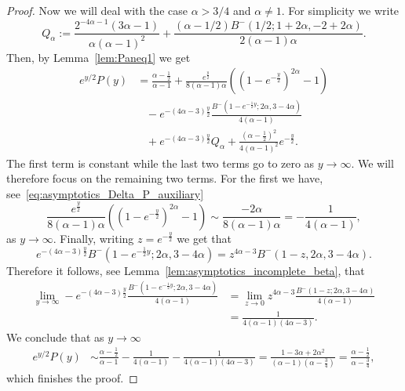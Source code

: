 \begin{proof}
Now we will deal with the case $\alpha > 3/4$ and $\alpha \not = 1$. For simplicity we write
\[
	Q_\alpha := \frac{2^{-4 \alpha-1} (3 \alpha - 1)}{\alpha (\alpha - 1)^2} 
		+ \frac{(\alpha - 1/2 ) B^-(1/2; 1 + 2 \alpha, -2 + 2 \alpha)}{2(\alpha - 1) \alpha}.
\]
Then, by Lemma~\ref{lem:Paneq1} we get
\begin{align*}
	e^{y/2} P(y) &= \frac{\alpha - \frac{1}{2}}{\alpha - 1} 
		+ \frac{e^{\frac{y}{2}}}{8(\alpha - 1)\alpha}\left(\left(1 - e^{-\frac{y}{2}}\right)^{2\alpha}-1\right)\\
	&\hspace{10pt}- e^{-(4\alpha - 3)\frac{y}{2}}\frac{B^-(1 - e^{-\frac{1}{2}y}; 2 \alpha, 3 - 4 \alpha)}{4 (\alpha - 1)}\\
	&\hspace{10pt}+ e^{-(4\alpha - 3)\frac{y}{2}}Q_\alpha + \frac{(\alpha-\frac{1}{2})^2}{4(\alpha-1)^2} e^{-\frac{y}{2}}.
\end{align*}
The first term is constant while the last two terms go to zero as $y \to \infty$. We will therefore focus on the remaining two terms. For the first we have, see~\eqref{eq:asymptotics_Delta_P_auxiliary} 
\[
	\frac{e^{\frac{y}{2}}}{8(\alpha - 1)\alpha}\left(\left(1 - e^{-\frac{y}{2}}\right)^{2\alpha}-1\right) 
	\sim \frac{-2\alpha}{8(\alpha - 1)\alpha} = -\frac{1}{4(\alpha -1)},
\]
as $y \to \infty$. Finally, writing $z = e^{-\frac{y}{2}}$ we get that
\[
	e^{-(4\alpha - 3)\frac{y}{2}} B^-(1 - e^{-\frac{1}{2}y}; 2 \alpha, 3 - 4 \alpha)
	= z^{4\alpha - 3} B^-(1 - z, 2 \alpha, 3 - 4 \alpha).
\]
Therefore it follows, see Lemma~\ref{lem:asymptotics_incomplete_beta}, that
\begin{align*}
	\lim_{y \to \infty} - e^{-(4\alpha - 3)\frac{y}{2}}
		\frac{B^-(1 - e^{-\frac{1}{2}y}; 2 \alpha, 3 - 4 \alpha)}{4 (\alpha - 1)}
	&= \lim_{z \to 0} z^{4\alpha - 3} \frac{B^-(1 - z; 2 \alpha, 3 - 4 \alpha)}{4(\alpha - 1)}\\
	&= \frac{1}{4(\alpha - 1)(4\alpha - 3)}.
\end{align*}
We conclude that as $y \to \infty$
\begin{align*}
	e^{y/2} P(y) 
	&\sim \frac{\alpha - \frac{1}{2}}{\alpha - 1} -\frac{1}{4(\alpha -1)} - \frac{1}{4(\alpha - 1)(4\alpha - 3)}
	= \frac{1 - 3\alpha + 2 \alpha^2}{(\alpha - 1)(\alpha - \frac{3}{4})} 
	= \frac{\alpha - \frac{1}{2}}{\alpha - \frac{3}{4}},
\end{align*}
which finishes the proof.
\end{proof}

